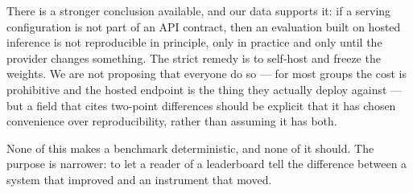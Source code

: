 There is a stronger conclusion available, and our data supports it: if a
serving configuration is not part of an API contract, then an evaluation built
on hosted inference is not reproducible in principle, only in practice and only
until the provider changes something. The strict remedy is to self-host and
freeze the weights. We are not proposing that everyone do so --- for most
groups the cost is prohibitive and the hosted endpoint is the thing they
actually deploy against --- but a field that cites two-point differences should
be explicit that it has chosen convenience over reproducibility, rather than
assuming it has both.

None of this makes a benchmark deterministic, and none of it should. The
purpose is narrower: to let a reader of a leaderboard tell the difference
between a system that improved and an instrument that moved.
